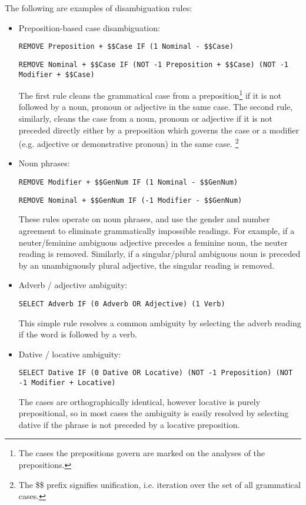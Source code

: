 \documentclass{book}
\begin{document}
The following are examples of disambiguation rules:
\begin{itemize}
\item Preposition-based case disambiguation:\nopagebreak

\texttt{REMOVE Preposition + \$\$Case IF (1 Nominal - \$\$Case)}

\texttt{REMOVE Nominal + \$\$Case IF (NOT -1 Preposition + \$\$Case) (NOT -1 Modifier + \$\$Case)}

The first rule cleans the grammatical case from a preposition\footnote{The cases the prepositions govern
are marked on the analyses of the prepositions.} 
if it is not followed by a noun, pronoun or adjective in the same case. The second
rule, similarly, cleans the case from a noun, pronoun or adjective if
it is not preceded directly either by a preposition which governs the case
or a modifier (e.g. adjective or demonstrative pronoun) in the same case.
\footnote{The \$\$ prefix signifies unification, i.e. iteration over the set of all
grammatical cases.}

\item Noun phrases:

\texttt{REMOVE Modifier + \$\$GenNum IF (1 Nominal - \$\$GenNum)}

\texttt{REMOVE Nominal + \$\$GenNum IF (-1 Modifier - \$\$GenNum)}

These rules operate on noun phrases, and use the gender and number agreement
to eliminate grammatically impossible readings. For example, 
if a neuter/feminine ambiguous adjective precedes a feminine noun, the neuter
reading is removed. Similarly, if a singular/plural ambiguous noun is preceded
by an unambiguously plural adjective, the singular reading is removed.

\item Adverb / adjective ambiguity:

\texttt{SELECT Adverb IF (0 Adverb OR Adjective) (1 Verb)}

This simple rule resolves a common ambiguity by selecting the adverb reading if the word is followed by a verb.

\item Dative / locative ambiguity:

\texttt{SELECT Dative IF (0 Dative OR Locative) (NOT -1 Preposition) (NOT -1 Modifier + Locative)}

The cases are orthographically identical, however locative
is purely prepositional, so in most cases the ambiguity is easily
resolved by selecting dative if the phrase
is not preceded by a locative preposition.

\end{itemize}
\end{document}
